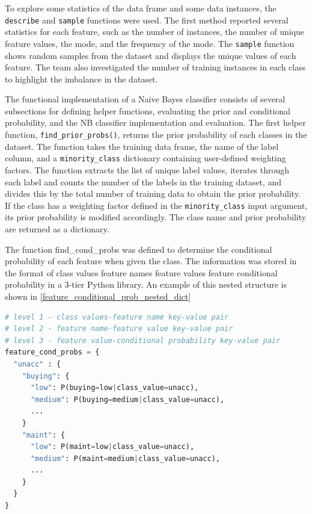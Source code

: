 \documentclass[a4paper]{article}
\begin{document}
To explore some statistics of the data frame and some data instances, the \lstinline{describe} and \lstinline{sample} functions were used. The first method reported several statistics for each feature, such as the number of instances, the number of unique feature values, the mode, and the frequency of the mode. The \lstinline{sample} function shows random samples from the dataset and displays the unique values of each feature. The team also investigated the number of training instances in each class to highlight the imbalance in the dataset.

The functional implementation of a Naive Bayes classifier consists of several subsections for defining helper functions, evaluating the prior and conditional probability, and the NB classifier implementation and evaluation. The first helper function, \lstinline{find_prior_probs()}, returns the prior probability of each classes in the dataset. The function takes the training data frame, the name of the label column, and a \lstinline{minority_class} dictionary containing user-defined weighting factors. The function extracts the list of unique label values, iterates through each label and counts the number of the labels in the training dataset, and divides this by the total number of training data to obtain the prior probability. If the class has a weighting factor defined in the \lstinline{minority_class} input argument, its prior probability is modified accordingly. The class name and prior probability are returned as a dictionary.

The function find\_cond\_probs was defined to determine the conditional probability of each feature when given the class. The information was stored in the format of class values \> feature names \> feature values \> feature conditional probability in a 3-tier Python library. An example of this nested structure is shown in \autoref{feature_conditional_prob_nested_dict}

\begin{lstlisting}[language=Python, label={feature_conditional_prob_nested_dict}, caption={Pseudo-code of the nested dictionary structure containing the conditional probabilities for P(feature value|class)}]
# level 1 - class values-feature name key-value pair
# level 2 - feature name-feature value key-value pair
# level 3 - feature value-conditional probability key-value pair
feature_cond_probs = {                    
  "unacc" : {                             
    "buying": {                           
      "low": P(buying=low|class_value=unacc),
      "medium": P(buying=medium|class_value=unacc),
      ...
    }
    "maint": {
      "low": P(maint=low|class_value=unacc),
      "medium": P(maint=medium|class_value=unacc),
      ...
    }
  }
}
\end{lstlisting}
\end{document}
